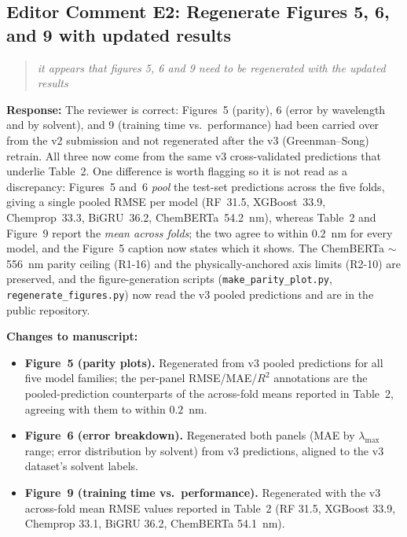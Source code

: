 \documentclass[11pt]{article}
\newenvironment{reviewer}{%
  \begin{quote}\itshape\color{black!70}}{%
  \end{quote}}
\newcommand{\response}[1]{\noindent\textbf{Response:} #1\par\medskip}
\newenvironment{changes}{%
  \noindent\textbf{Changes to manuscript:}
  \begin{itemize}[leftmargin=2em,itemsep=2pt]}{%
  \end{itemize}\medskip}
\begin{document}
\subsection*{Editor Comment E2: Regenerate Figures 5, 6, and 9 with updated results}
\begin{reviewer}
it appears that figures 5, 6 and 9 need to be regenerated with the updated results
\end{reviewer}
\response{The reviewer is correct: Figures~5 (parity), 6 (error by wavelength and by solvent), and 9 (training time vs.\ performance) had been carried over from the v2 submission and not regenerated after the v3 (Greenman--Song) retrain. All three now come from the same v3 cross-validated predictions that underlie Table~2. One difference is worth flagging so it is not read as a discrepancy: Figures~5 and~6 \emph{pool} the test-set predictions across the five folds, giving a single pooled RMSE per model (RF~31.5, XGBoost~33.9, Chemprop~33.3, BiGRU~36.2, ChemBERTa~54.2~nm), whereas Table~2 and Figure~9 report the \emph{mean across folds}; the two agree to within $0.2$~nm for every model, and the Figure~5 caption now states which it shows. The ChemBERTa $\sim$556~nm parity ceiling (R1-16) and the physically-anchored axis limits (R2-10) are preserved, and the figure-generation scripts (\texttt{make\_parity\_plot.py}, \texttt{regenerate\_figures.py}) now read the v3 pooled predictions and are in the public repository.}
\begin{changes}
  \item \textbf{Figure~5 (parity plots).} Regenerated from v3 pooled predictions for all five model families; the per-panel RMSE/MAE/$R^2$ annotations are the pooled-prediction counterparts of the across-fold means reported in Table~2, agreeing with them to within $0.2$~nm.
  \item \textbf{Figure~6 (error breakdown).} Regenerated both panels (MAE by $\lambda_{\max}$ range; error distribution by solvent) from v3 predictions, aligned to the v3 dataset's solvent labels.
  \item \textbf{Figure~9 (training time vs.\ performance).} Regenerated with the v3 across-fold mean RMSE values reported in Table~2 (RF 31.5, XGBoost 33.9, Chemprop 33.1, BiGRU 36.2, ChemBERTa 54.1~nm).
\end{changes}
\end{document}
